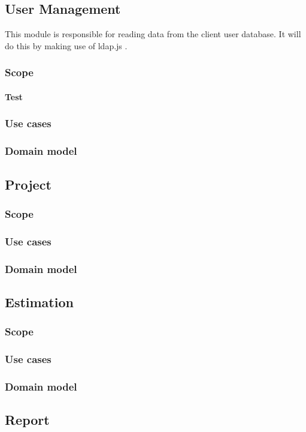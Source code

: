 \subsection{User Management}
This module is responsible for reading data from the client user database. It will do this by making use of ldap.js .
\subsubsection{Scope}
\paragraph{Test}
\subsubsection{Use cases}
\subsubsection{Domain model}
\subsection{Project}
\subsubsection{Scope}
\subsubsection{Use cases}
\subsubsection{Domain model}
\subsection{Estimation}
\subsubsection{Scope}
\subsubsection{Use cases}
\subsubsection{Domain model}
\subsection{Report}
